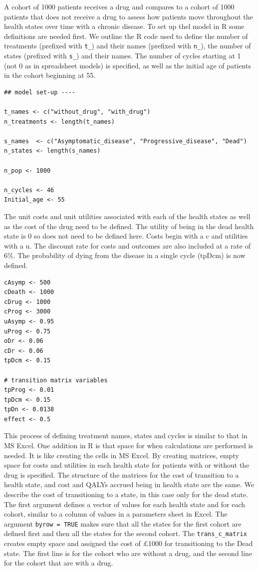 \documentclass[a4paper,twoside,openany]{../svmonoBUGS}\usepackage[]{graphicx}\usepackage[]{color}
\begin{document}
A cohort of 1000 patients receives a drug and compares to a cohort of 1000 patients that does not receive a drug to assess how patients move throughout the health states over time with a chronic disease. To set up thel model in R some definitions are needed first. We outline the R code used to define the number of treatments (prefixed with \texttt{t\_}) and their names (prefixed with \texttt{n\_}), the number of states (prefixed with \texttt{s\_}) and their names. The number of cycles starting at 1 (not 0 as in spreadsheet models) is specified, as well as the initial age of patients in the cohort beginning at 55.

\begin{verbatim}
## model set-up ----

t_names <- c("without_drug", "with_drug")
n_treatments <- length(t_names)

s_names  <- c("Asymptomatic_disease", "Progressive_disease", "Dead")
n_states <- length(s_names)

n_pop <- 1000

n_cycles <- 46
Initial_age <- 55
\end{verbatim}

The unit costs and unit utilities associated with each of the health states as well as the cost of the drug need to be defined.
The utility of being in the dead health state is 0 so does not need to be defined here.
Costs begin with a c and utilities with a u. The discount rate for costs and outcomes are also included at a rate of 6\%.
The probability of dying from the disease in a single cycle (tpDcm) is now defined.

\begin{verbatim}
cAsymp <- 500
cDeath <- 1000
cDrug <- 1000
cProg <- 3000
uAsymp <- 0.95
uProg <- 0.75
oDr <- 0.06
cDr <- 0.06
tpDcm <- 0.15

# transition matrix variables
tpProg <- 0.01
tpDcm <- 0.15
tpDn <- 0.0138
effect <- 0.5
\end{verbatim}

This process of defining treatment names, states and cycles is similar to that in MS Excel. One addition in R is that space for when calculations are performed is needed. It is like creating the cells in MS Excel. By creating matrices, empty space for costs and utilities in each health state for patients with or without the drug is specified. The structure of the matrices for the cost of transition to a health state, and cost and QALYs accrued being in health state are the same. We describe the cost of transitioning to a state, in this case only for the dead state. The first argument defines a vector of values for each health state and for each cohort, similar to a column of values in a parameters sheet in Excel. The argument \texttt{byrow = TRUE} makes sure that all the states for the first cohort are defined first and then all the states for the second cohort.
The \texttt{trans\_c\_matrix} creates empty space and assigned the cost of £1000 for transitioning to the Dead state.
The first line is for the cohort who are without a drug, and the second line for the cohort that are with a drug. 
\end{document}
